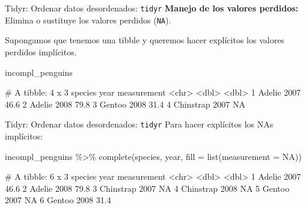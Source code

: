 \documentclass[
  ignorenonframetext,
  aspectratio=169]{beamer}
\newenvironment{Shaded}{\begin{snugshade}}{\end{snugshade}}
\newcommand{\AttributeTok}[1]{\textcolor[rgb]{0.77,0.63,0.00}{#1}}
\newcommand{\ConstantTok}[1]{\textcolor[rgb]{0.00,0.00,0.00}{#1}}
\newcommand{\FunctionTok}[1]{\textcolor[rgb]{0.00,0.00,0.00}{#1}}
\newcommand{\NormalTok}[1]{#1}
\newcommand{\SpecialCharTok}[1]{\textcolor[rgb]{0.00,0.00,0.00}{#1}}
\let\oldverbatim\verbatim
\let\endoldverbatim\endverbatim
\renewenvironment{verbatim}{\tiny\oldverbatim}{\endoldverbatim}
\begin{document}
\begin{frame}[fragile]{Tidyr: Ordenar datos desordenados:
\texttt{tidyr}}
\protect\hypertarget{tidyr-ordenar-datos-desordenados-tidyr-10}{}
\textbf{Manejo de los valores perdidos:} Elimina o sustituye los valores
perdidos (\texttt{NA}).

Supongamos que tenemos una tibble y queremos hacer explícitos los
valores perdidos implícitos.

\begin{Shaded}
\begin{Highlighting}[]
\NormalTok{incompl\_penguins}
\end{Highlighting}
\end{Shaded}

\begin{verbatim}
# A tibble: 4 x 3
  species    year measurement
  <chr>     <dbl>       <dbl>
1 Adelie     2007        46.6
2 Adelie     2008        79.8
3 Gentoo     2008        31.4
4 Chinstrap  2007        NA  
\end{verbatim}
\end{frame}

\begin{frame}[fragile]{Tidyr: Ordenar datos desordenados:
\texttt{tidyr}}
\protect\hypertarget{tidyr-ordenar-datos-desordenados-tidyr-11}{}
Para hacer explícitos los NAs implícitos:

\begin{Shaded}
\begin{Highlighting}[]
\NormalTok{incompl\_penguins }\SpecialCharTok{\%\textgreater{}\%} 
  \FunctionTok{complete}\NormalTok{(species, year, }\AttributeTok{fill =} \FunctionTok{list}\NormalTok{(}\AttributeTok{measurement =} \ConstantTok{NA}\NormalTok{))}
\end{Highlighting}
\end{Shaded}

\begin{verbatim}
# A tibble: 6 x 3
  species    year measurement
  <chr>     <dbl>       <dbl>
1 Adelie     2007        46.6
2 Adelie     2008        79.8
3 Chinstrap  2007        NA  
4 Chinstrap  2008        NA  
5 Gentoo     2007        NA  
6 Gentoo     2008        31.4
\end{verbatim}
\end{frame}
\end{document}
